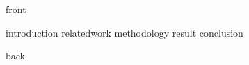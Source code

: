 \documentclass{beamer}
\begin{document}
{front}

{introduction}
{relatedwork}
{methodology}
{result}
{conclusion}

{back}
											 
\end{document}
